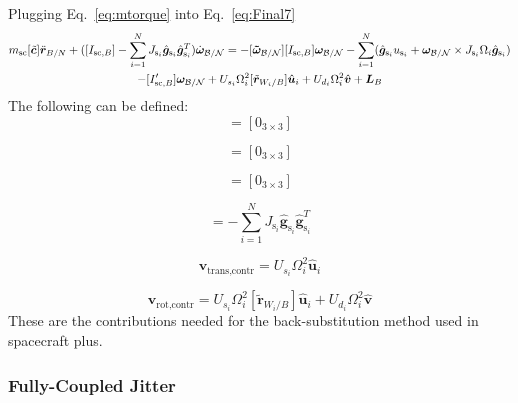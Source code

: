 Plugging Eq.~\eqref{eq:mtorque} into Eq.~\eqref{eq:Final7}
\begin{multline}
m_{\text{sc}}[\tilde{\bm{c}}] \ddot{\bm r}_{B/N}
+([I_{\text{sc},B}]-\sum_{i=1}^{N}J_{\text{s}_i} \hat{\bm g}_{\text{s}_i} \hat{\bm g}_{\text{s}_i}^T) \dot{\bm\omega}_{\cal B/N}
= -[\bm{\tilde{\omega}}_{\cal B/N}] [I_{\text{sc},B}] \bm\omega_{\cal B/N} - \sum_{i=1}^{N}(\hat{\bm g}_{\text{s}_i} u_{\text{s}_i} + \bm\omega_{\cal B/N}\times J_{\text{s}_i}\Omega_i\hat{\bm g}_{\text{s}_i})
\\- [I'_{\text{sc},B}] \bm\omega_{\cal B/N} + U_{s_i}\Omega_i^2[\tilde{\bm{r}}_{W_i/B}]\hat{\bm{u}}_i + U_{d_i}\Omega_i^2\hat{\bm{v}} + \bm{L}_B
\label{eq:Final72}
\end{multline}
The following can be defined:
\begin{equation}
[A_\text{contr}] = [0_{3 \times 3}]
\end{equation}

\begin{equation}
[B_\text{contr}] = [0_{3 \times 3}]
\end{equation}

\begin{equation}
[C_\text{contr}] = [0_{3 \times 3}]
\end{equation}

\begin{equation}
[D_\text{contr}] = -\sum_{i=1}^{N}J_{\text{s}_i} \hat{\bm g}_{\text{s}_i} \hat{\bm g}_{\text{s}_i}^T
\end{equation}

\begin{equation}
\bm v_{\text{trans,contr}} = U_{s_i}\Omega_i^2\hat{\bm{u}}_i
\end{equation}

\begin{equation}
\bm v_{\text{rot,contr}} =  U_{s_i}\Omega_i^2[\tilde{\bm{r}}_{W_i/B}]\hat{\bm{u}}_i + U_{d_i}\Omega_i^2\hat{\bm{v}}
\end{equation}
These are the contributions needed for the back-substitution method used in spacecraft plus.

\subsubsection{Fully-Coupled Jitter}

